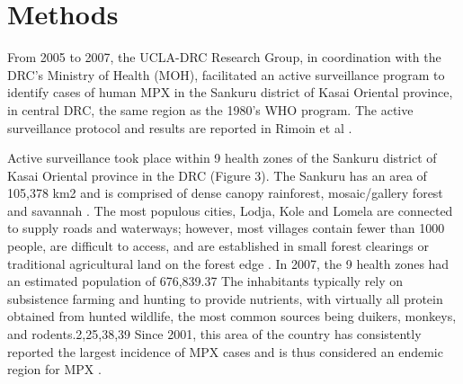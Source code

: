 \section{Methods}

From 2005 to 2007, the UCLA-DRC Research Group, in coordination with the DRC’s Ministry of Health (MOH), facilitated an active surveillance program to identify cases of human MPX in the Sankuru district of Kasai Oriental province, in central DRC, the same region as the 1980’s WHO program. The active surveillance protocol and results are reported in Rimoin et al \cite{Rimoin2010}.

Active surveillance took place within 9 health zones of the Sankuru district of Kasai Oriental province in the DRC (Figure 3). The Sankuru has an area of 105,378 km2 and is comprised of dense canopy rainforest, mosaic/gallery forest and savannah \cite{Fuller2011}. The most populous cities, Lodja, Kole and Lomela are connected to supply roads and waterways; however, most villages contain fewer than 1000 people, are difficult to access, and are established in small forest clearings or traditional agricultural land on the forest edge \cite{Rimoin2010}. In 2007, the 9 health zones had an estimated population of 676,839.37 The inhabitants typically rely on subsistence farming and hunting to provide nutrients, with virtually all protein obtained from hunted wildlife, the most common sources being duikers, monkeys, and rodents.2,25,38,39 Since 2001, this area of the country has consistently reported the largest incidence of MPX cases and is thus considered an endemic region for MPX \cite{Rimoin2010}. 






